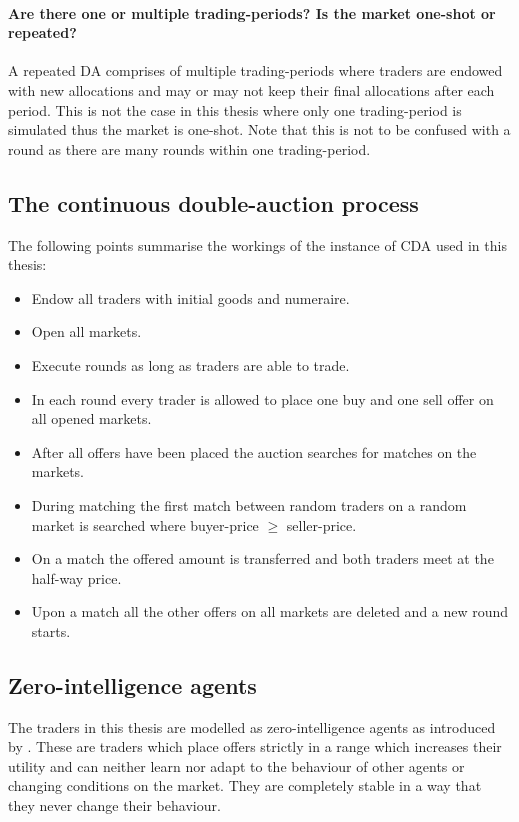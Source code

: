 \documentclass[../Bachelorarbeit.tex]{subfiles}
\begin{document}
\paragraph{Are there one or multiple trading-periods? Is the market one-shot or repeated?} A repeated DA comprises of multiple trading-periods where traders are endowed with new allocations and may or may not keep their final allocations after each period. This is not the case in this thesis where only one trading-period is simulated thus the market is one-shot. Note that this is not to be confused with a \gls{round} as there are many rounds within one trading-period.

\subsection{The continuous double-auction process}

The following points summarise the workings of the instance of CDA used in this thesis:

\begin{itemize}
\item Endow all traders with initial goods and numeraire.
\item Open all markets.
\item Execute rounds as long as traders are able to trade.
\item In each round every trader is allowed to place one buy and one sell offer on all opened markets.
\item After all offers have been placed the auction searches for matches on the markets.
\item During matching the first match between random traders on a random market is searched where buyer-price $\geq$ seller-price.
\item On a match the offered amount is transferred and both traders meet at the half-way price.
\item Upon a match all the other offers on all markets are deleted and a new round starts.
\end{itemize}

\subsection{Zero-intelligence agents}
\label{sec:ZERO_INTELLIGENCE_AGENTS}
The traders in this thesis are modelled as zero-intelligence agents as introduced by \cite{GodeSunder1993}. These are traders which place offers strictly in a range which increases their utility and can neither learn nor adapt to the behaviour of other agents or changing conditions on the market. They are completely stable in a way that they never change their behaviour. 
\end{document}
